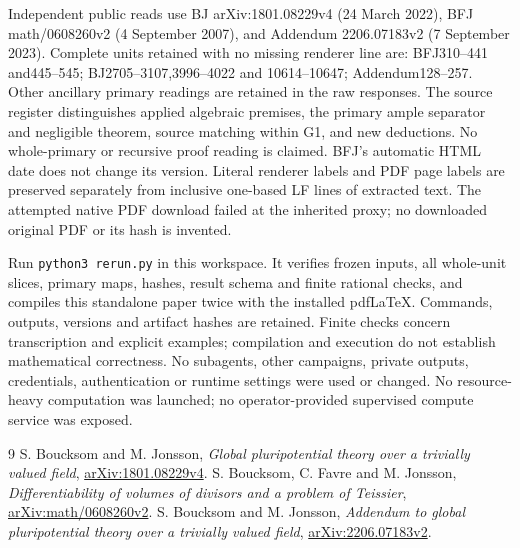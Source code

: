 \documentclass[10pt]{article}
\begin{document}
Independent public reads use BJ arXiv:1801.08229v4 (24 March 2022),
BFJ math/0608260v2 (4 September 2007), and Addendum 2206.07183v2
(7 September 2023). Complete units retained with no missing renderer
line are: BFJ310--441 and445--545; BJ2705--3107,3996--4022 and
10614--10647; Addendum128--257. Other ancillary primary readings
are retained in the raw responses. The source register distinguishes
applied algebraic premises, the primary ample separator and negligible
theorem, source matching within G1, and new deductions. No whole-primary
or recursive proof reading is claimed. BFJ's automatic HTML date does
not change its version. Literal renderer labels and PDF page labels are
preserved separately from inclusive one-based LF lines of extracted text.
The attempted native PDF download failed at the inherited proxy; no
downloaded original PDF or its hash is invented.

Run \texttt{python3 rerun.py} in this workspace. It verifies frozen inputs,
all whole-unit slices, primary maps, hashes, result schema and finite
rational checks, and compiles this standalone paper twice with the installed
pdfLaTeX. Commands, outputs, versions and artifact hashes are retained.
Finite checks concern transcription and explicit examples; compilation
and execution do not establish mathematical correctness.
No subagents, other campaigns, private outputs, credentials, authentication
or runtime settings were used or changed. No resource-heavy computation
was launched; no operator-provided supervised compute service was exposed.

\begin{thebibliography}{9}
 S. Boucksom and M. Jonsson, \emph{Global pluripotential theory
over a trivially valued field}, \href{https://arxiv.org/pdf/1801.08229v4}{arXiv:1801.08229v4}.
 S. Boucksom, C. Favre and M. Jonsson, \emph{Differentiability
of volumes of divisors and a problem of Teissier},
\href{https://arxiv.org/html/math/0608260v2}{arXiv:math/0608260v2}.
 S. Boucksom and M. Jonsson, \emph{Addendum to global
pluripotential theory over a trivially valued field},
\href{https://arxiv.org/pdf/2206.07183v2}{arXiv:2206.07183v2}.
\end{thebibliography}
\end{document}
